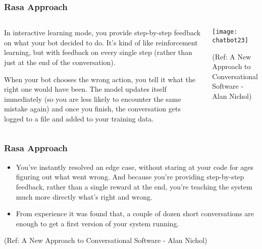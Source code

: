  \begin{frame}[fragile]\frametitle{Rasa Approach}
 
\begin{columns}
\begin{column}[T]{0.5\linewidth}

In interactive learning mode, you provide step-by-step feedback on what your bot decided to do. It's kind of like reinforcement learning, but with feedback on every single step (rather than just at the end of the conversation).

When your bot chooses the wrong action, you tell it what the right one would have been. The model updates itself immediately (so you are less likely to encounter the same mistake again) and once you finish, the conversation gets logged to a file and added to your training data.
\end{column}
\begin{column}[T]{0.5\linewidth}

\begin{center}
\texttt{[image: chatbot23]}

\end{center}

{\tiny (Ref: A New Approach to Conversational Software - Alan Nichol)}

\end{column}
\end{columns}
\end{frame}

 \begin{frame}[fragile]\frametitle{Rasa Approach}
 

\begin{itemize}
\item You've instantly resolved an edge case, without staring at your code for ages figuring out what went wrong. And because you're providing step-by-step feedback, rather than a single reward at the end, you're teaching the system much more directly what's right and wrong.
\item  From experience it was found that, a couple of dozen short conversations are enough to get a first version of your system running.
\end{itemize}

{\tiny (Ref: A New Approach to Conversational Software - Alan Nichol)}


\end{frame}

